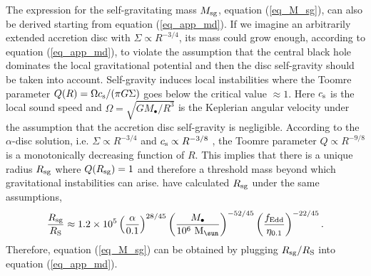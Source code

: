 \documentclass[a4paper,fleqn,usenatbib]{mnras}
\begin{document}
The expression for the self-gravitating mass $M_{\rm sg}$, equation (\ref{eq_M_sg}), can also be derived starting from equation (\ref{eq_app_md}).
If we imagine an arbitrarily extended accretion disc with $\Sigma \propto R^{-3/4}$, its mass could grow enough, according to equation (\ref{eq_app_md}), to violate the assumption that the central black hole dominates the local gravitational potential and then the disc self-gravity should be taken into account.
Self-gravity induces local instabilities where the Toomre parameter $Q(R) = \Omega c_{\rm s} / (\pi G \Sigma)$ goes below the critical value $\approx 1$.
Here $c_{\rm s}$ is the local sound speed and $\Omega = \sqrt{G M_{\bullet} / R^3}$ is the Keplerian angular velocity under the assumption that the accretion disc self-gravity is negligible.
According to the $\alpha$-disc solution, i.e. $\Sigma \propto R^{-3/4}$ and $c_{\rm s} \propto R^{-3/8}$ \citep{shakura+73}, the Toomre parameter $Q \propto R^{-9/8}$ is a monotonically decreasing function of $R$.
This implies that there is a unique radius $R_{\rm sg}$ where $Q(R_{\rm sg}) = 1$ and therefore a threshold mass beyond which gravitational instabilities can arise.
\citet{perego+09} have calculated $R_{\rm sg}$ under the same assumptions,
\begin{equation}
\frac{R_{\rm sg}}{R_{\rm S}} \approx 1.2 \times 10^5 \left( \frac{\alpha}{0.1} \right)^{28/45} \left( \frac{M_{\bullet}}{10^6~{\rm M}_{\sun}} \right)^{-52/45} \left( \frac{f_{\rm Edd}}{\eta_{0.1}} \right)^{-22/45}.
\end{equation}
Therefore, equation (\ref{eq_M_sg}) can be obtained by plugging $R_{\rm sg}/R_{\rm S}$ into equation (\ref{eq_app_md}).
\end{document}
